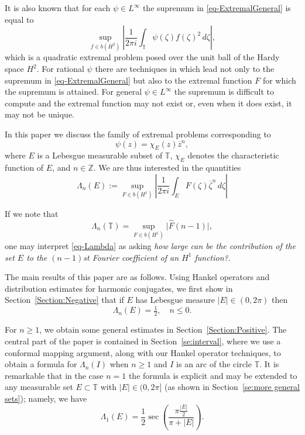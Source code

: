 \documentclass[11pt,reqno]{amsart}
\numberwithin{equation}{section}
\theoremstyle{plain}
\theoremstyle{definition}
\begin{document}
	It is also known \cite{CFT, NLEPHS}
	that for each $\psi \in L^{\infty}$ the supremum in \eqref{eq-ExtremalGeneral} is equal to
	\begin{equation}\label{eq-ExtremalQuadratic}
		\sup_{f \in b(H^2)} \left|\frac{1}{2 \pi i} \int_{\mathbb{T}} \psi(\zeta) f(\zeta)^2 \,d\zeta \right|,
	\end{equation}
	which is a quadratic extremal problem posed over the unit ball of the Hardy space $H^2$.  For rational $\psi$ there are techniques in \cite{CFT, NLEPHS} which lead not only to the supremum in \eqref{eq-ExtremalGeneral} but also to the extremal function $F$ for which the supremum is attained. For general $\psi \in L^{\infty}$ the supremum is difficult to compute and the extremal function may not exist or, even when it does exist, it may not be unique. 
		
	In this paper we discuss the family of extremal problems corresponding to 
	\begin{equation}\label{eq-Symbol}
		\psi(z) = \chi_E(z) \overline{z}^{n},
	\end{equation}
	where $E$ is a Lebesgue measurable subset of ${\mathbb{T}}$, $\chi_E$ denotes the characteristic function of $E$, and $n \in { \mathbb{Z}}$. We are thus interested in the quantities
	\begin{equation}\label{eq-Lambda}
		\Lambda_{n}(E) := \sup_{F \in b(H^1)} 
		\left|\frac{1}{2 \pi i} \int_E  F(\zeta) \overline{\zeta}^{n} \, d\zeta\right|
	\end{equation}
	
		If we note that
	\begin{equation*}
		\Lambda_n({\mathbb{T}}) = \sup_{F \in b(H^1)} \big| \widehat{F}(n-1)\big|,
	\end{equation*}
	one may  interpret \eqref{eq-Lambda} as asking \emph{how large can be the contribution of the set $E$ to the $(n-1)$st Fourier coefficient of an $H^1$ function?}.
	
The main results of this paper are as follows. Using Hankel operators and distribution estimates for harmonic conjugates, we first show in Section~\ref{Section:Negative} that if $E$ has Lebesgue measure $|E| \in (0, 2 \pi)$ then
			$$\Lambda_{n}(E) = \tfrac{1}{2}, \quad n \leq 0.$$
			
For $n\ge 1$, we obtain some general estimates in Section~\ref{Section:Positive}. The central part of the paper is contained in Section~\ref{se:interval}, where we use a conformal mapping argument, along with our Hankel operator techniques, to obtain a formula for $\Lambda_{n}(I)$ when $n \geq 1$ and $I$ is an arc of the circle ${\mathbb{T}}$. It is remarkable that in the case $n=1$ the formula is explicit and may be extended to any measurable set $E\subset {\mathbb{T}}$ with $|E| \in (0, 2 \pi]$ (as shown in Section~\ref{se:more general sets}); namely, we have 
$$\Lambda_{1}(E) = \frac{1}{2} \sec\left(\frac{\pi \frac{|E|}{2}}{\pi + |E|}\right).$$			
			
\end{document}
